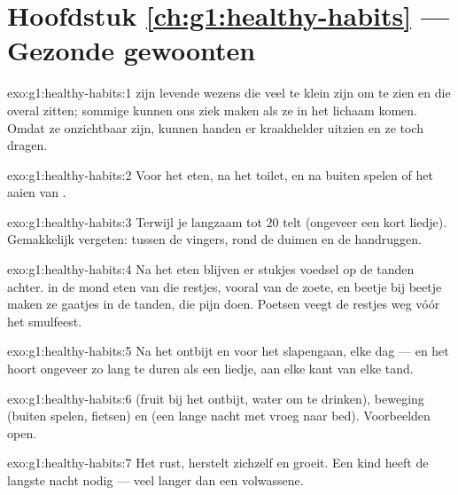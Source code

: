 \section*{Hoofdstuk \ref{ch:g1:healthy-habits} --- Gezonde gewoonten}

\begin{solution}{exo:g1:healthy-habits:1}
 zijn levende wezens die veel te klein zijn om te zien en
die overal zitten; sommige kunnen ons ziek maken als ze in het lichaam
komen. Omdat ze onzichtbaar zijn, kunnen handen er kraakhelder uitzien
en ze toch dragen.
\end{solution}

\begin{solution}{exo:g1:healthy-habits:2}
Voor het eten, na het toilet, en na buiten spelen of het aaien van
.
\end{solution}

\begin{solution}{exo:g1:healthy-habits:3}
Terwijl je langzaam tot $20$ telt (ongeveer een kort liedje).
Gemakkelijk vergeten: tussen de vingers, rond de duimen en de
handruggen.
\end{solution}

\begin{solution}{exo:g1:healthy-habits:4}
Na het eten blijven er stukjes voedsel op de tanden achter.
 in de mond eten van die restjes, vooral van de zoete, en
beetje bij beetje maken ze gaatjes in de tanden, die pijn doen.
Poetsen veegt de restjes weg vóór het smulfeest.
\end{solution}

\begin{solution}{exo:g1:healthy-habits:5}
Na het ontbijt en voor het slapengaan, elke dag --- en het hoort
ongeveer zo lang te duren als een liedje, aan elke kant van elke tand.
\end{solution}

\begin{solution}{exo:g1:healthy-habits:6}
 (fruit bij het ontbijt, water om te drinken), beweging
(buiten spelen, fietsen) en  (een lange nacht met vroeg naar bed).
Voorbeelden open.
\end{solution}

\begin{solution}{exo:g1:healthy-habits:7}
Het rust, herstelt zichzelf en groeit. Een kind heeft de langste nacht
nodig --- veel langer dan een volwassene.
\end{solution}

